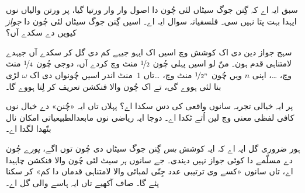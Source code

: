 \documentclass[../../../include/open-logic-section]{subfiles}
\begin{document}
سبق ایہ اے کہ گِنن جوگ سیٹاں لئی چُون دا اصول وار وار ورتیا گیا، پر ورتن والیاں نوں ایہدا بہت پتا نہیں سی۔ فلسفیانہ سوال ایہ اے۔ اسیں گِنن جوگ سیٹاں لئی چُون دا \emph{جواز} کیویں دے سکدے آں؟

سہج جواز دین دی اک کوشش وچ اسیں اک ایہو جیہے کم دی گل کر سکدے آں جیہدے لامتناہی قدم ہون۔ منّ لو اسیں پہلی چُون $\nicefrac{1}{2}$ منٹ وچ کردے آں، دوجی چُون $\nicefrac{1}{4}$ منٹ وچ، \dots، اپنی $n$ ویں چُون $\nicefrac{1}{2^n}$ منٹ وچ، \dots\@ تاں $1$~منٹ اندر اسیں چُونواں دی اک $\omega$ لڑی بنا لئی ہووے گی، تے اک چُون والا فنکشن تعریف کر لِتا ہووے گا۔

پر ایہ خیالی تجربہ سانوں واقعی کی دس سکدا اے؟ پہلاں تاں ایہ «چُنن» دے خیال نوں کافی لفظی معنی وچ لین اُتے ٹکدا اے۔ دوجا ایہ ریاضی نوں مابعدالطبیعیاتی امکان نال بنّھدا لگدا اے۔

ہور ضروری گل ایہ اے کہ ایہ کوشش \emph{بس} گِنن جوگ سیٹاں دی چُون توں اگے، \emph{پورے} چُون دے مسلّمے دا کوئی جواز نہیں دیندی۔ جے سانوں \emph{ہر} سیٹ لئی چُون والا فنکشن چاہیدا اے، تاں سانوں «کسے وی ترتیبی عدد جِنّی لمبائی والا لامتناہی قدماں دا کم» کر سکنا پئے گا۔ صاف آکھیے تاں ایہ ہاسے والی گل اے۔
\end{document}
